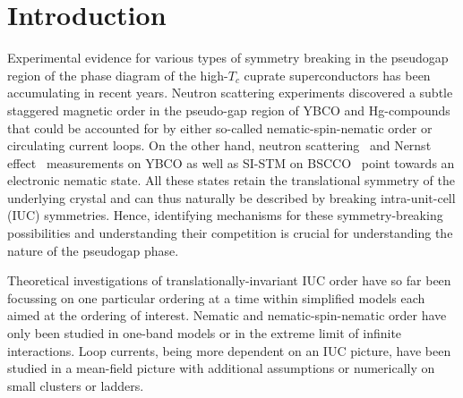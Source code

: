 \documentclass[prb, twocolumn,showpacs,preprintnumbers,amsmath,amssymb, floatfix]{revtex4}
\begin{document}
\section{Introduction}
\label{sec:intro}
Experimental evidence for various types of symmetry breaking in the pseudogap
region of the phase diagram of the high-$T_c$ cuprate superconductors
has been accumulating in recent years. 
Neutron scattering experiments discovered a subtle
staggered magnetic order in the pseudo-gap region of
YBCO\cite{fauque:2006} and Hg-compounds\cite{li:2008}
that could be accounted for by either so-called nematic-spin-nematic
order\cite{oganesyan:2001, wu:2007} or circulating current
loops\cite{varma:2006b}. On the other hand, neutron
scattering~\cite{hinkov:2008} and Nernst effect~\cite{daou:2010}
measurements on YBCO as well as SI-STM on BSCCO~\cite{lawler:2010}
point towards an electronic nematic state. All these states retain the
translational symmetry of the underlying crystal and can thus
naturally be described by breaking intra-unit-cell (IUC) symmetries. Hence,
identifying mechanisms for these symmetry-breaking possibilities and
understanding their competition is crucial for understanding the
nature of the pseudogap phase.  

Theoretical investigations of translationally-invariant IUC order 
have so far been focussing on one particular ordering at a time within simplified
models each aimed at the ordering of interest.
Nematic and nematic-spin-nematic order have only been studied in one-band models\cite{yamase:2000c,oganesyan:2001, wu:2007, kee:2003,metzner:2003, yamase:2005,
halboth:2000, gull:2009,okamoto:2010} or in the extreme limit of infinite interactions\cite{kivelson:2004}. Loop currents, being more dependent on an IUC picture, have been studied in a mean-field picture with additional assumptions\cite{varma:2006b} or numerically on small clusters or ladders\cite{chudzinski:2007, greiter:2008, weber:2009}.
\end{document}
